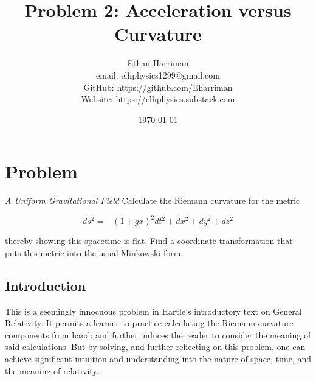 \documentclass[11pt]{article}
\title{Problem 2: Acceleration versus Curvature}
\author{Ethan Harriman \\ email: elhphysics1299@gmail.com \\ GitHub: https://github.com/Eharriman \\ Website: https://elhphysics.substack.com}
\date{\today}
\begin{document}
\maketitle

\section{Problem}

\textit{A Uniform Gravitational Field} Calculate the Riemann curvature for the metric

\begin{equation}
    \label{uniform metric}
    ds^2 = -(1 + gx)^2 dt^2 + dx^2 + dy^2 + dz^2
\end{equation}

thereby showing this spacetime is flat. Find a coordinate transformation that puts this metric into the usual Minkowski form.

\subsection{Introduction}

This is a seemingly innocuous problem in Hartle's introductory text on General Relativity. It permits a learner to practice calculating the Riemann curvature components from hand; and further induces the reader to consider the meaning of said calculations. But by solving, and further reflecting on this problem, one can achieve significant intuition and understanding into the nature of space, time, and the meaning of relativity.
\end{document}
